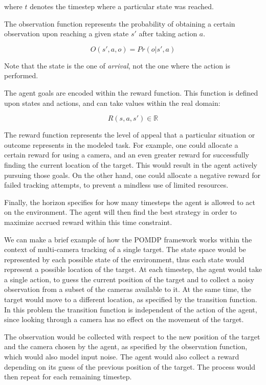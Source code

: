 where $t$ denotes the timestep where a particular state was reached.

The observation function represents the probability of obtaining a certain observation upon reaching
a given state $s'$ after taking action $a$.

\begin{equation}
 O(s', a, o) = Pr(o | s', a)
\end{equation}

Note that the state is the one of \textit{arrival}, not the one where the action is performed.

The agent goals are encoded within the reward function. This function is defined upon states and
actions, and can take values within the real domain:

\begin{equation}
 R(s, a, s') \in \mathbb{R}
\end{equation}

The reward function represents the level of appeal that a particular situation or outcome represents
in the modeled task. For example, one could allocate a certain reward for using a camera, and an
even greater reward for successfully finding the current location of the target. This would result
in the agent actively pursuing those goals. On the other hand, one could allocate a negative reward
for failed tracking attempts, to prevent a mindless use of limited resources.

Finally, the horizon specifies for how many timesteps the agent is allowed to act on the
environment. The agent will then find the best strategy in order to maximize accrued reward within
this time constraint.

We can make a brief example of how the POMDP framework works within the context of multi-camera
tracking of a single target. The state space would be represented by each possible state of the
environment, thus each state would represent a possible location of the target. At each timestep,
the agent would take a single action, to guess the current position of the target and to collect a
noisy observation from a subset of the cameras available to it. At the same time, the target would move
to a different location, as specified by the transition function. In this problem the transition
function is independent of the action of the agent, since looking through a camera has no effect on
the movement of the target.

The observation would be collected with respect to the new position of the target and the camera
chosen by the agent, as specified by the observation function, which would also model input noise.
The agent would also collect a reward depending on its guess of the previous position of the target.
The process would then repeat for each remaining timestep.

